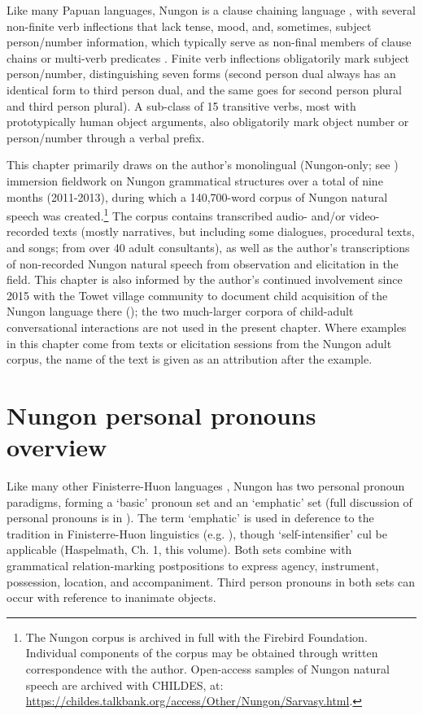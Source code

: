 \documentclass[output=paper,colorlinks,citecolor=brown]{langscibook}
\begin{document}
Like many Papuan languages, Nungon is a clause chaining language \citep{Sarvasy2015Imperative, Sarvasy2020Chains}, with several non-finite verb inflections that lack tense, mood, and, sometimes, subject person/number information, which typically serve as non-final members of clause chains or multi-verb predicates \citep{Sarvasy2020Predicates}. Finite verb inflections obligatorily mark subject person/number, distinguishing seven forms (second person dual always has an identical form to third person dual, and the same goes for second person plural and third person plural). A sub-class of 15 transitive verbs, most with prototypically human object arguments, also obligatorily mark object number or person/number through a verbal prefix.   

This chapter primarily draws on the author’s monolingual (Nungon-only; see \citealt{Sarvasy2016Fieldwork}) immersion fieldwork on Nungon grammatical structures over a total of nine months (2011-2013), during which a 140,700-word corpus of Nungon natural speech was created.\footnote{The Nungon corpus is archived in full with the Firebird Foundation. Individual components of the corpus may be obtained through written correspondence with the author. Open-access samples of Nungon natural speech are archived with CHILDES, at: \url{https://childes.talkbank.org/access/Other/Nungon/Sarvasy.html}.}  The corpus contains transcribed audio- and/or video-recorded texts (mostly narratives, but including some dialogues, procedural texts, and songs; from over 40 adult consultants), as well as the author’s transcriptions of non-recorded Nungon natural speech from observation and elicitation in the field. This chapter is also informed by the author’s continued involvement since 2015 with the Towet village community to document child acquisition of the Nungon language there (\citealt{Sarvasy2019Root, Sarvasy2020Predicates, Sarvasy2020Chains}); the two much-larger corpora of child-adult conversational interactions are not used in the present chapter. Where examples in this chapter come from texts or elicitation sessions from the Nungon adult corpus, the name of the text is given as an attribution after the example.  

\section{Nungon personal pronouns overview}\label{sec:sarvasy:2}

Like many other Finisterre-Huon languages \citep[21]{McElhanon1973}, Nungon has two personal pronoun paradigms, forming a ‘basic’ pronoun set and an ‘emphatic’ set (full discussion of personal pronouns is in \citealt[351--359]{Sarvasy2017Grammar}). The term ‘emphatic’ is used in deference to the tradition in Finisterre-Huon linguistics (e.g. \citealt{McElhanon1973}), though ‘self-intensifier’ cul be applicable (Haspelmath, Ch. 1, this volume). Both sets combine with grammatical relation-marking postpositions to express agency, instrument, possession, location, and accompaniment. Third person pronouns in both sets can occur with reference to inanimate objects.
\end{document}
